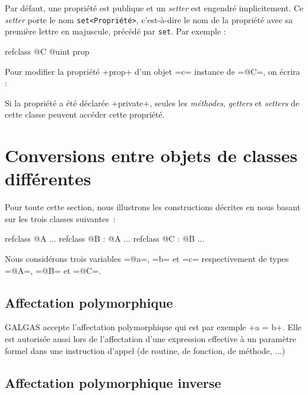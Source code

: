 Par défaut, une propriété est publique et un \emph{setter} est engendré implicitement. Ce \emph{setter} porte le nom \texttt{set<Propriété>}, c'est-à-dire le nom de la propriété avec sa première lettre en majuscule, précédé par \texttt{set}. Par exemple :

\begin{galgas}
refclass @C {
  @uint prop
}
\end{galgas}


Pour modifier la propriété \ggs+prop+ d'un objet \ggs=c= instance de \ggs=@C=, on écrira :

\begin{galgas}
[!?c setProp !12]
\end{galgas}

Si la propriété a été déclarée \ggs+private+, seules les \emph{méthodes}, \emph{getters} et \emph{setters} de cette classe peuvent accéder cette propriété.












\section{Conversions entre objets de classes différentes}

Pour toute cette section, nous illustrons les constructions décrites en nous basant sur les trois classes suivantes~:
\begin{galgas}
refclass @A {
  ...
}
refclass @B : @A {
  ...
}
refclass @C : @B {
  ...
}
\end{galgas}

Nous considérons trois variables \ggs=@a=, \ggs=b= et \ggs=c= respectivement de types \ggs=@A=, \ggs=@B= et \ggs=@C=.


\subsection{Affectation polymorphique}

GALGAS accepte l'affectation polymorphique qui est par exemple \ggs+a = b+. Elle est autorisée aussi lors de l'affectation d'une expression effective à un paramètre formel dans une instruction d'appel (de routine, de fonction, de méthode, ...)


\subsection{Affectation polymorphique inverse}

